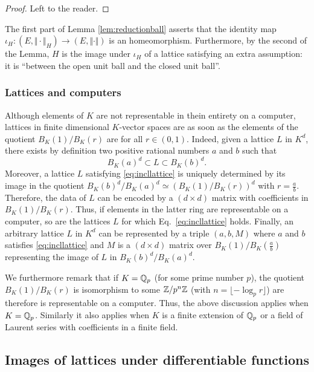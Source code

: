 \documentclass{lms}
\begin{document}
\begin{proof}
Left to the reader.
\end{proof}

The first part of Lemma \ref{lem:reductionball} asserts that the 
identity map $\iota_H : (E, \Vert \cdot \Vert_H) \to (E, \Vert \cdot 
\Vert)$ is an homeomorphism. Furthermore, by the second of the Lemma, 
$H$ is the image under $\iota_H$ of a lattice satisfying an extra 
assumption: it is ``between the open unit ball and the closed unit 
ball''.

\subsubsection*{Lattices and computers}

Although elements of $K$ are not representable in thein entirety on a 
computer, lattices in finite dimensional $K$-vector spaces are as soon 
as the elements of the quotient $B_K(1)/B_K(r)$ are for all $r \in 
(0,1)$. Indeed, given a lattice $L$ in $K^d$, there exists by definition 
two positive rational numbers $a$ and $b$ such that 
\begin{equation}
\label{eq:incllattice}
B_K(a)^d \subset L \subset B_K(b)^d.
\end{equation}
Moreover, a lattice $L$ satisfying \eqref{eq:incllattice} is uniquely 
determined by its image in the quotient $B_K(b)^d / B_K(a)^d \simeq 
(B_K(1)/B_K(r))^d$ with $r = \frac a b$. Therefore, the data of $L$ can 
be encoded by a $(d \times d)$ matrix with coefficients in $B_K(1)/
B_K(r)$. Thus, if elements in the latter ring are representable on a 
computer, so are the lattices $L$ for which Eq.~\eqref{eq:incllattice} 
holds. Finally, an arbitrary lattice $L$ in $K^d$ can be represented
by a triple $(a,b,M)$ where $a$ and $b$ satisfies \eqref{eq:incllattice}
and $M$ is a $(d \times d)$ matrix over $B_K(1)/B_K(\frac a b)$ 
representing the image of $L$ in $B_K(b)^d / B_K(a)^d$.

We furthermore remark that if $K = \mathbb Q_p$ (for some prime number $p$), 
the quotient $B_K(1)/B_K(r)$ is isomorphism to some $\mathbb Z/p^n\mathbb Z$ (with $n 
= \lfloor - \log_p r \rfloor$) are therefore is representable on a 
computer. Thus, the above discussion applies when $K = \mathbb Q_p$. Similarly 
it also applies when $K$ is a finite extension of $\mathbb Q_p$ or a field of
Laurent series with coefficients in a finite field.

\subsection{Images of lattices under differentiable functions}
\end{document}
